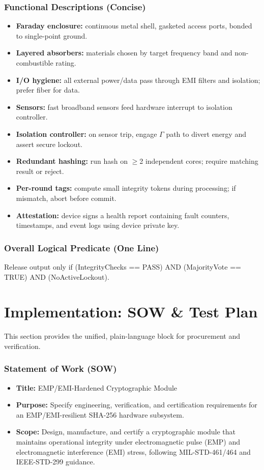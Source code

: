 \documentclass[11pt, a4paper]{article}
\begin{document}
\section{Functional Descriptions (Concise)}
\begin{itemize}
    \item \textbf{Faraday enclosure:} continuous metal shell, gasketed access ports, bonded to single-point ground.
    \item \textbf{Layered absorbers:} materials chosen by target frequency band and non-combustible rating.
    \item \textbf{I/O hygiene:} all external power/data pass through EMI filters and isolation; prefer fiber for data.
    \item \textbf{Sensors:} fast broadband sensors feed hardware interrupt to isolation controller.
    \item \textbf{Isolation controller:} on sensor trip, engage $\Gamma$ path to divert energy and assert secure lockout.
    \item \textbf{Redundant hashing:} run hash on $\ge$2 independent cores; require matching result or reject.
    \item \textbf{Per-round tags:} compute small integrity tokens during processing; if mismatch, abort before commit.
    \item \textbf{Attestation:} device signs a health report containing fault counters, timestamps, and event logs using device private key.
\end{itemize}

\section{Overall Logical Predicate (One Line)}
Release output only if (IntegrityChecks == PASS) AND (MajorityVote == TRUE) AND (NoActiveLockout).

\newpage
\part{Implementation: SOW \& Test Plan}
\label{part:sow_test_plan}
This section provides the unified, plain-language block for procurement and verification.

\section{Statement of Work (SOW)}
\begin{itemize}
    \item \textbf{Title:} EMP/EMI-Hardened Cryptographic Module
    \item \textbf{Purpose:} Specify engineering, verification, and certification requirements for an EMP/EMI-resilient SHA-256 hardware subsystem.
    \item \textbf{Scope:} Design, manufacture, and certify a cryptographic module that maintains operational integrity under electromagnetic pulse (EMP) and electromagnetic interference (EMI) stress, following MIL-STD-461/464 and IEEE-STD-299 guidance.
\end{itemize}
\end{document}
